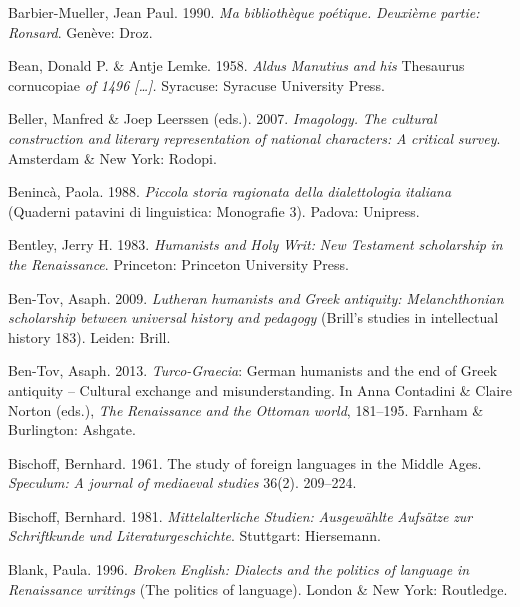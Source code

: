 \documentclass[output=paper]{langsci/langscibook}
\begin{document}
Barbier-Mueller, Jean Paul. 1990. \textit{Ma} \textit{bibliothèque} \textit{poétique.} \textit{Deuxième} \textit{partie:} \textit{Ronsard}. Genève: Droz.

Bean, Donald P. \& Antje Lemke. 1958. \textit{Aldus} \textit{Manutius} \textit{and} \textit{his} Thesaurus cornucopiae \textit{of} \textit{1496} \textit{[…].} Syracuse: Syracuse University Press.

Beller, Manfred \& Joep Leerssen (eds.). 2007. \textit{Imagology.} \textit{The} \textit{cultural} \textit{construction} \textit{and} \textit{literary} \textit{representation} \textit{of} \textit{national} \textit{characters:} \textit{A} \textit{critical} \textit{survey}. Amsterdam \& New York: Rodopi.

Benincà, Paola. 1988. \textit{Piccola} \textit{storia} \textit{ragionata} \textit{della} \textit{dialettologia} \textit{italiana} (Quaderni patavini di linguistica: Monografie 3). Padova: Unipress.

Bentley, Jerry H. 1983. \textit{Humanists} \textit{and} \textit{Holy} \textit{Writ:} \textit{New} \textit{Testament} \textit{scholarship} \textit{in} \textit{the} \textit{Renaissance}. Princeton: Princeton University Press.

Ben-Tov, Asaph. 2009. \textit{Lutheran} \textit{humanists} \textit{and} \textit{Greek} \textit{antiquity:} \textit{Melanchthonian} \textit{scholarship} \textit{between} \textit{universal} \textit{history} \textit{and} \textit{pedagogy} (Brill’s studies in intellectual history 183). Leiden: Brill.

Ben-Tov, Asaph. 2013. \textit{Turco-Graecia}: German humanists and the end of Greek antiquity – Cultural exchange and misunderstanding. In Anna Contadini \& Claire Norton (eds.), \textit{The} \textit{Renaissance} \textit{and} \textit{the} \textit{Ottoman} \textit{world}, 181–195. Farnham \& Burlington: Ashgate.

Bischoff, Bernhard. 1961. The study of foreign languages in the Middle Ages. \textit{Speculum:} \textit{A} \textit{journal} \textit{of} \textit{mediaeval} \textit{studies} 36(2). 209–224.

Bischoff, Bernhard. 1981. \textit{Mittelalterliche} \textit{Studien:} \textit{Ausgewählte} \textit{Aufsätze} \textit{zur} \textit{Schriftkunde} \textit{und} \textit{Literaturgeschichte}. Stuttgart: Hiersemann.

Blank, Paula. 1996. \textit{Broken} \textit{English:} \textit{Dialects} \textit{and} \textit{the} \textit{politics} \textit{of} \textit{language} \textit{in} \textit{Renaissance} \textit{writings} (The politics of language). London \& New York: Routledge.
\end{document}
